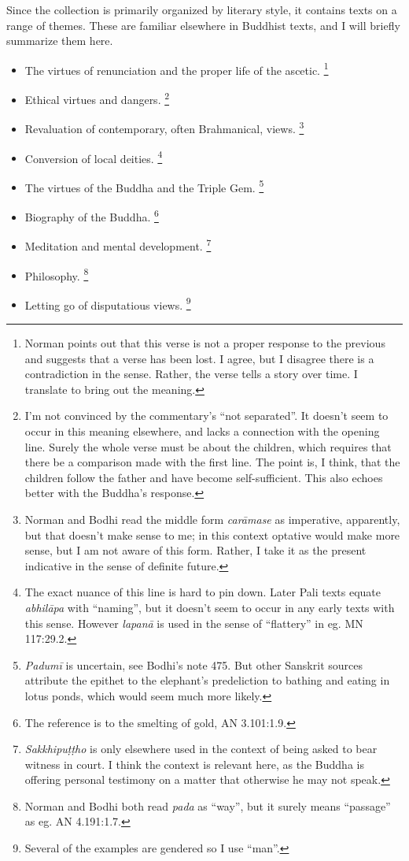 \documentclass[12pt,openany]{book}%
\begin{document}
Since the collection is primarily organized by literary style, it contains texts on a range of themes. These are familiar elsewhere in Buddhist texts, and I will briefly summarize them here.

\begin{itemize}%
\item The virtues of renunciation and the proper life of the ascetic. \footnote{Norman points out that this verse is not a proper response to the previous and suggests that a verse has been lost. I agree, but I disagree there is a contradiction in the sense. Rather, the verse tells a story over time. I translate to bring out the meaning. }%
\item Ethical virtues and dangers. \footnote{I’m not convinced by the commentary’s “not separated”. It doesn’t seem to occur in this meaning elsewhere, and lacks a connection with the opening line. Surely the whole verse must be about the children, which requires that there be a comparison made with the first line. The point is, I think, that the children follow the father and have become self-sufficient. This also echoes better with the Buddha’s response. }%
\item Revaluation of contemporary, often Brahmanical, views. \footnote{Norman and Bodhi read the middle form \textit{\textsanskrit{carāmase}} as imperative, apparently, but that doesn’t make sense to me; in this context optative would make more sense, but I am not aware of this form. Rather, I take it as the present indicative in the sense of definite future. }%
\item Conversion of local deities. \footnote{The exact nuance of this line is hard to pin down. Later Pali texts equate \textit{\textsanskrit{abhilāpa}} with “naming”, but it doesn’t seem to occur in any early texts with this sense. However \textit{\textsanskrit{lapanā}} is used in the sense of “flattery” in eg. MN 117:29.2. }%
\item The virtues of the Buddha and the Triple Gem. \footnote{\textit{\textsanskrit{Padumī}} is uncertain, see Bodhi’s note 475. But other Sanskrit sources attribute the epithet to the elephant’s predeliction to bathing and eating in lotus ponds, which would seem much more likely. }%
\item Biography of the Buddha. \footnote{The reference is to the smelting of gold, AN 3.101:1.9. }%
\item Meditation and mental development. \footnote{\textit{\textsanskrit{Sakkhipuṭṭho}} is only elsewhere used in the context of being asked to bear witness in court. I think the context is relevant here, as the Buddha is offering personal testimony on a matter that otherwise he may not speak. }%
\item Philosophy. \footnote{Norman and Bodhi both read \textit{pada} as “way”, but it surely means “passage” as eg. AN 4.191:1.7. }%
\item Letting go of disputatious views. \footnote{Several of the examples are gendered so I use “man”. }%
\end{itemize}
\end{document}
